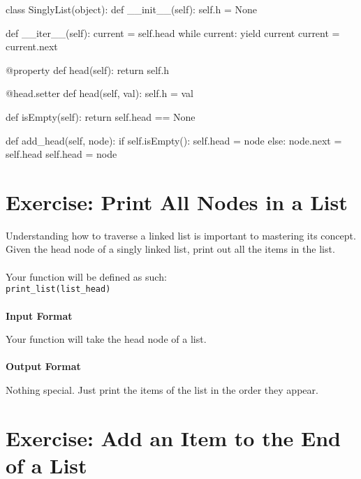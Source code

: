 \documentclass{42-en}
\begin{document}
        \begin{42pycode}
class SinglyList(object):
    def __init__(self):
        self.h = None

    def __iter__(self):
        current = self.head
        while current:
            yield current
            current = current.next

    @property
    def head(self):
        return self.h

    @head.setter
    def head(self, val):
        self.h = val

    def isEmpty(self):
        return self.head == None

    def add_head(self, node):
        if self.isEmpty():
            self.head = node
        else:
            node.next = self.head
            self.head = node
    \end{42pycode}

\startexercices

\chapter{Exercise\exercicenumber: Print All Nodes in a List}

\exnumber{\exercicenumber}

\makeheaderfiles
    Understanding how to traverse a linked list is important to mastering
    its concept. Given the head node of a singly linked list, print out all
    the items in the list.\\
    \\
    Your function will be defined as such:\\
    \texttt{print\_list(list\_head)}\\
    \\
    \textbf{Input Format}

    Your function will take the head node of a list.\\
    \\
    \textbf{Output Format}

    Nothing special. Just print the items of the list in the order they appear.

\nextexercice

\chapter{Exercise\exercicenumber: Add an Item to the End of a List}
\end{document}
